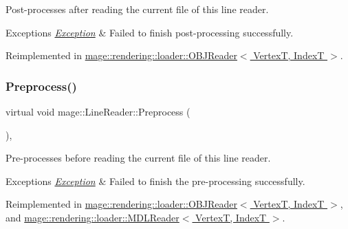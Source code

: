 Post-\/processes after reading the current file of this line reader.


\begin{DoxyExceptions}{Exceptions}
{\em \hyperlink{classmage_1_1_exception}{Exception}} & Failed to finish post-\/processing successfully. \\
\hline
\end{DoxyExceptions}


Reimplemented in \hyperlink{classmage_1_1rendering_1_1loader_1_1_o_b_j_reader_a281c16ef7d20a7c1416923f3cadee33a}{mage\+::rendering\+::loader\+::\+O\+B\+J\+Reader$<$ Vertex\+T, Index\+T $>$}.

\hypertarget{classmage_1_1_line_reader_a4de135cfb0434be786cfcfd7959031ef}{}\label{classmage_1_1_line_reader_a4de135cfb0434be786cfcfd7959031ef} 
\subsubsection{\texorpdfstring{Preprocess()}{Preprocess()}}
{\footnotesize\ttfamily virtual void mage\+::\+Line\+Reader\+::\+Preprocess (\begin{DoxyParamCaption}{ }\end{DoxyParamCaption})\hspace{0.3cm}{\ttfamily [private]}, {\ttfamily [virtual]}}

Pre-\/processes before reading the current file of this line reader.


\begin{DoxyExceptions}{Exceptions}
{\em \hyperlink{classmage_1_1_exception}{Exception}} & Failed to finish the pre-\/processing successfully. \\
\hline
\end{DoxyExceptions}


Reimplemented in \hyperlink{classmage_1_1rendering_1_1loader_1_1_o_b_j_reader_ad082a6295259f7e8af2c60c182ea55d3}{mage\+::rendering\+::loader\+::\+O\+B\+J\+Reader$<$ Vertex\+T, Index\+T $>$}, and \hyperlink{classmage_1_1rendering_1_1loader_1_1_m_d_l_reader_a397f0c0eedc56c983fc3a7074aa4e577}{mage\+::rendering\+::loader\+::\+M\+D\+L\+Reader$<$ Vertex\+T, Index\+T $>$}.

\hypertarget{classmage_1_1_line_reader_aa1ba5aa332e49bdd63ef4ee4021120fd}{}\label{classmage_1_1_line_reader_aa1ba5aa332e49bdd63ef4ee4021120fd} 
